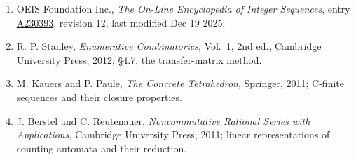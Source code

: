 \documentclass[11pt]{article}
\theoremstyle{definition}
\begin{document}
\begin{enumerate}

\item OEIS Foundation Inc., \emph{The On-Line Encyclopedia of Integer Sequences}, entry \href{https://oeis.org/A230393}{A230393}, revision 12, last modified Dec 19 2025.

\item R. P. Stanley, \emph{Enumerative Combinatorics}, Vol.~1, 2nd ed., Cambridge University Press, 2012; \S4.7, the transfer-matrix method.

\item M. Kauers and P. Paule, \emph{The Concrete Tetrahedron}, Springer, 2011; C-finite sequences and their closure properties.

\item J. Berstel and C. Reutenauer, \emph{Noncommutative Rational Series with Applications}, Cambridge University Press, 2011; linear representations of counting automata and their reduction.

\end{enumerate}
\end{document}
